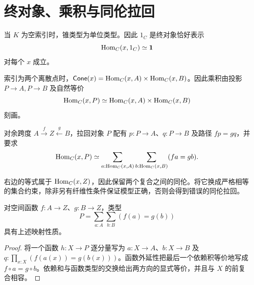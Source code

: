 \section{终对象、乘积与同伦拉回}
\begin{example}[终对象]
当 $K$ 为空索引时，锥类型为单位类型。因此 $1_C$ 是终对象恰好表示
\[
\operatorname{Hom}_C(x,1_C)\simeq\mathbf 1
\]
对每个 $x$ 成立。
\end{example}
\begin{example}[二元乘积]
索引为两个离散点时，$\mathsf{Cone}(x)=\operatorname{Hom}_C(x,A)\times\operatorname{Hom}_C(x,B)$。因此乘积由投影 $P\to A,P\to B$ 及自然等价
\[
\operatorname{Hom}_C(x,P)\simeq
\operatorname{Hom}_C(x,A)\times\operatorname{Hom}_C(x,B)
\]
刻画。
\end{example}
\begin{definition}[同伦拉回]
对余跨度 $A\xrightarrow f Z\xleftarrow g B$，拉回对象 $P$ 配有 $p:P\to A$、$q:P\to B$ 及路径 $fp=gq$，并要求
\[
\operatorname{Hom}_C(x,P)\simeq
\sum_{a:\operatorname{Hom}_C(x,A)}\sum_{b:\operatorname{Hom}_C(x,B)}
(fa=gb).
\]
\end{definition}
\begin{remark}
右边的等式属于 $\operatorname{Hom}_C(x,Z)$，因此保留两个复合之间的同伦。将它换成严格相等的集合约束，除非另有纤维性条件保证模型正确，否则会得到错误的同伦拉回。
\end{remark}
\begin{proposition}[空间中的拉回公式]
对空间函数 $f:A\to Z$、$g:B\to Z$，类型
\[
P=\sum_{a:A}\sum_{b:B}(f(a)=g(b))
\]
具有上述映射性质。
\end{proposition}
\begin{proof}
将一个函数 $h:X\to P$ 逐分量写为 $a:X\to A$、$b:X\to B$ 及 $q:\prod_{x:X}(f(a(x))=g(b(x)))$。函数外延性把最后一个依赖积等价地写成 $f\circ a=g\circ b$。依赖和与函数类型的交换给出两方向的显式等价，并且与 $X$ 的前复合相容。
\end{proof}

